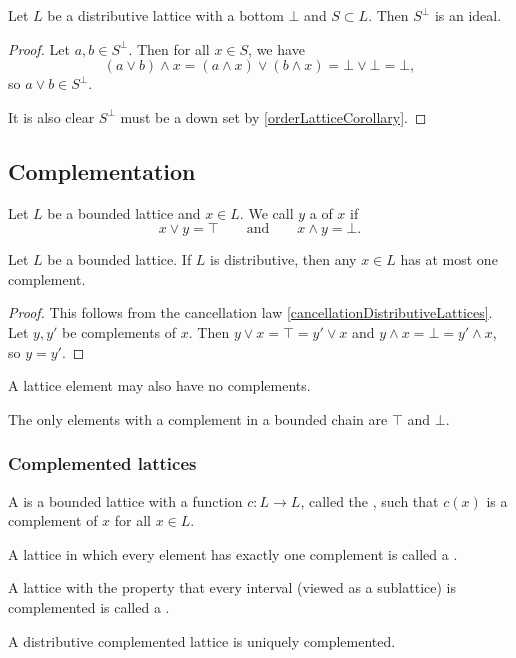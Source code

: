 \begin{lemma} \label{disjointComplementIdeal}
Let $L$ be a distributive lattice with a bottom $\bot$ and $S\subset L$. Then $S^\perp$ is an ideal.
\end{lemma}
\begin{proof}
Let $a,b\in S^\perp$. Then for all $x\in S$, we have
\[ (a\vee b)\wedge x = (a\wedge x)\vee (b\wedge x) = \bot\vee \bot = \bot, \]
so $a\vee b\in S^\perp$.

It is also clear $S^\perp$ must be a down set by \ref{orderLatticeCorollary}.
\end{proof}

\subsection{Complementation}
\begin{definition}
Let $L$ be a bounded lattice and $x\in L$. We call $y$ a  of $x$ if
\[ x \vee y = \top \qquad \text{and} \qquad x\wedge y = \bot. \]
\end{definition}

\begin{proposition} \label{distributiveComplementUnique}
Let $L$ be a bounded lattice. If $L$ is distributive, then any $x\in L$ has at most one complement.
\end{proposition}
\begin{proof}
This follows from the cancellation law \ref{cancellationDistributiveLattices}. Let $y,y'$ be complements of $x$. Then $y\vee x = \top = y'\vee x$ and $y\wedge x = \bot = y'\wedge x$, so $y=y'$.
\end{proof}

A lattice element may also have no complements.
\begin{example}
The only elements with a complement in a bounded chain are $\top$ and $\bot$.
\end{example}

\subsubsection{Complemented lattices}
\begin{definition}
A  is a bounded lattice with a function $c:L\to L$, called the , such that $c(x)$ is a complement of $x$ for all $x\in L$.

A lattice in which every element has exactly one complement is called a .

A lattice with the property that every interval (viewed as a sublattice) is complemented is called a .
\end{definition}
A distributive complemented lattice is uniquely complemented.


